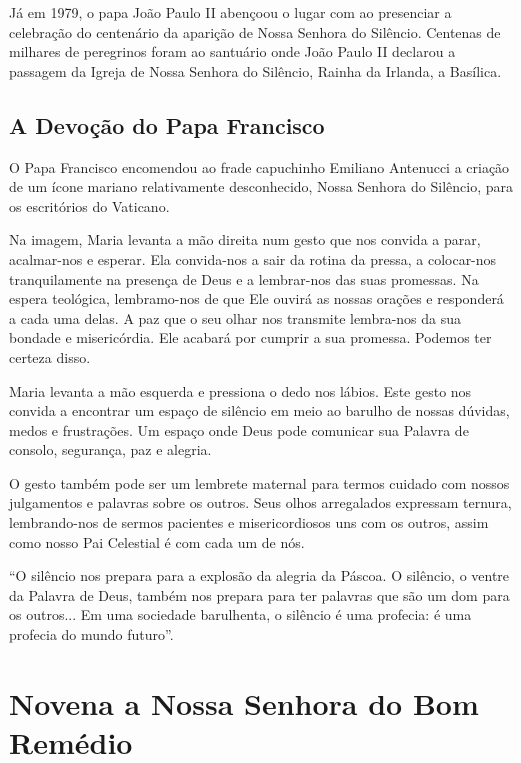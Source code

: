 \documentclass[a4paper,14pt]{extarticle} \usepackage[utf8]{inputenc}
\begin{document}
Já em 1979, o papa João Paulo II abençoou o lugar com ao presenciar a celebração do centenário da aparição de Nossa Senhora do Silêncio. Centenas de milhares de peregrinos foram ao santuário onde João Paulo II declarou a passagem da Igreja de Nossa Senhora do Silêncio, Rainha da Irlanda, a Basílica.

\subsection{A Devoção do Papa Francisco}

O Papa Francisco encomendou ao frade capuchinho Emiliano Antenucci a criação de um ícone mariano relativamente desconhecido, Nossa Senhora do Silêncio, para os escritórios do Vaticano.

Na imagem, Maria levanta a mão direita num gesto que nos convida a parar, acalmar-nos e esperar. Ela convida-nos a sair da rotina da pressa, a colocar-nos tranquilamente na presença de Deus e a lembrar-nos das suas promessas. Na espera teológica, lembramo-nos de que Ele ouvirá as nossas orações e responderá a cada uma delas. A paz que o seu olhar nos transmite lembra-nos da sua bondade e misericórdia. Ele acabará por cumprir a sua promessa. Podemos ter certeza disso.

Maria levanta a mão esquerda e pressiona o dedo nos lábios. Este gesto nos convida a encontrar um espaço de silêncio em meio ao barulho de nossas dúvidas, medos e frustrações. Um espaço onde Deus pode comunicar sua Palavra de consolo, segurança, paz e alegria.

O gesto também pode ser um lembrete maternal para termos cuidado com nossos julgamentos e palavras sobre os outros. Seus olhos arregalados expressam ternura, lembrando-nos de sermos pacientes e misericordiosos uns com os outros, assim como nosso Pai Celestial é com cada um de nós.

“O silêncio nos prepara para a explosão da alegria da Páscoa. O silêncio, o ventre da Palavra de Deus, também nos prepara para ter palavras que são um dom para os outros... Em uma sociedade barulhenta, o silêncio é uma profecia: é uma profecia do mundo futuro”.

\newpage

\newpage

\section{Novena a Nossa Senhora do Bom Remédio}
\end{document}
